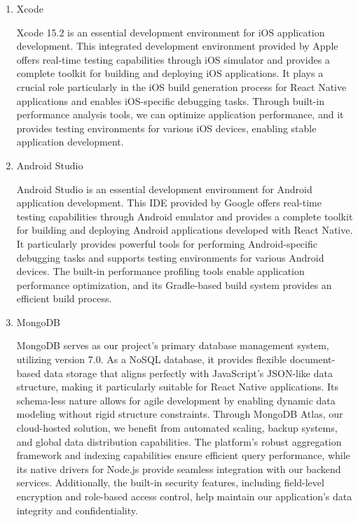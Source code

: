 \documentclass[conference]{IEEEtran}
\begin{document}
\begin{enumerate}[label=\arabic*]
    \vspace{1em}

    \item Xcode\par
    \vspace{0.3em}
    Xcode 15.2 is an essential development environment for iOS application development. This integrated development environment provided by Apple offers real-time testing capabilities through iOS simulator and provides a complete toolkit for building and deploying iOS applications. It plays a crucial role particularly in the iOS build generation process for React Native applications and enables iOS-specific debugging tasks. Through built-in performance analysis tools, we can optimize application performance, and it provides testing environments for various iOS devices, enabling stable application development.

    \vspace{1em}

    \item Android Studio \par
    \vspace{0.3em}
    Android Studio is an essential development environment for Android application development. This IDE provided by Google offers real-time testing capabilities through Android emulator and provides a complete toolkit for building and deploying Android applications developed with React Native. It particularly provides powerful tools for performing Android-specific debugging tasks and supports testing environments for various Android devices. The built-in performance profiling tools enable application performance optimization, and its Gradle-based build system provides an efficient build process.

    \vspace{1em}

    \item MongoDB\par
    \vspace{0.3em}
    MongoDB serves as our project's primary database management system, utilizing version 7.0. As a NoSQL database, it provides flexible document-based data storage that aligns perfectly with JavaScript's JSON-like data structure, making it particularly suitable for React Native applications. Its schema-less nature allows for agile development by enabling dynamic data modeling without rigid structure constraints. Through MongoDB Atlas, our cloud-hosted solution, we benefit from automated scaling, backup systems, and global data distribution capabilities. The platform's robust aggregation framework and indexing capabilities ensure efficient query performance, while its native drivers for Node.js provide seamless integration with our backend services. Additionally, the built-in security features, including field-level encryption and role-based access control, help maintain our application's data integrity and confidentiality.


\end{enumerate}
\end{document}
